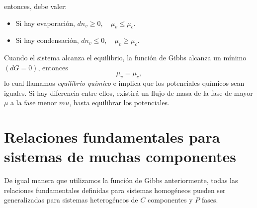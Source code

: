 \documentclass[openany]{book}
\begin{document}
entonces, debe valer:
\begin{itemize}
	\item Si hay evaporación, $dn_{v}\geq0,\quad\mu_{v}\leq\mu_{c}.$
	\item Si hay condensación, $dn_{v}\leq0,\quad\mu_{v}\geq\mu_{c}$.
\end{itemize}
Cuando el sistema alcanza el equilibrio, la función de Gibbs alcanza un mínimo $(dG=0)$, entonces
\begin{equation}\label{eq:mu-equim}
	\mu_{v}=\mu_{c},
\end{equation}
lo cual llamamos \emph{equilibrio químico} e implica que los potenciales químicos sean iguales. Si hay diferencia entre ellos, existirá un flujo de masa de la fase de mayor $\mu$ a la fase menor $mu$, hasta equilibrar los potenciales.

\section{Relaciones fundamentales para sistemas de muchas componentes}
De igual manera que utilizamos la función de Gibbs anteriormente, todas las relaciones fundamentales definidas para sistemas homogéneos pueden ser generalizadas para sistemas heterogéneos de $C$ componentes y $P$ fases.
\end{document}
